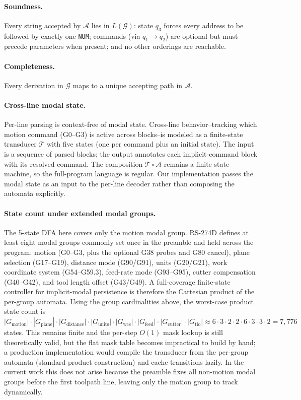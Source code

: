 \documentclass[11pt]{article}
\begin{document}
\paragraph{Soundness.} Every string accepted by $\mathcal{A}$ lies in $L(\mathcal{G})$: state $q_3$ forces every address to be followed by exactly one \texttt{NUM}; commands (via $q_1 \to q_2$) are optional but must precede parameters when present; and no other orderings are reachable.

\paragraph{Completeness.} Every derivation in $\mathcal{G}$ maps to a unique accepting path in $\mathcal{A}$.

\paragraph{Cross-line modal state.} Per-line parsing is context-free of modal state. Cross-line behavior--tracking which motion command (G0--G3) is active across blocks--is modeled as a finite-state transducer $\mathcal{T}$ with five states (one per command plus an initial state). The input is a sequence of parsed blocks; the output annotates each implicit-command block with its resolved command. The composition $\mathcal{T} \circ \mathcal{A}$ remains a finite-state machine, so the full-program language is regular. Our implementation passes the modal state as an input to the per-line decoder rather than composing the automata explicitly.

\paragraph{State count under extended modal groups.}
The 5-state DFA here covers only the motion modal group. RS-274D defines at least eight modal groups commonly set once in the preamble and held across the program: motion (G0--G3, plus the optional G38 probes and G80 cancel), plane selection (G17--G19), distance mode (G90/G91), units (G20/G21), work coordinate system (G54--G59.3), feed-rate mode (G93--G95), cutter compensation (G40--G42), and tool length offset (G43/G49). A full-coverage finite-state controller for implicit-modal persistence is therefore the Cartesian product of the per-group automata. Using the group cardinalities above, the worst-case product state count is $|G_{\text{motion}}| \cdot |G_{\text{plane}}| \cdot |G_{\text{distance}}| \cdot |G_{\text{units}}| \cdot |G_{\text{wcs}}| \cdot |G_{\text{feed}}| \cdot |G_{\text{cutter}}| \cdot |G_{\text{tlo}}| \approx 6 \cdot 3 \cdot 2 \cdot 2 \cdot 6 \cdot 3 \cdot 3 \cdot 2 = 7{,}776$ states. This remains finite and the per-step $O(1)$ mask lookup is still theoretically valid, but the flat mask table becomes impractical to build by hand; a production implementation would compile the transducer from the per-group automata (standard product construction) and cache transitions lazily. In the current work this does not arise because the preamble fixes all non-motion modal groups before the first toolpath line, leaving only the motion group to track dynamically.
\end{document}
